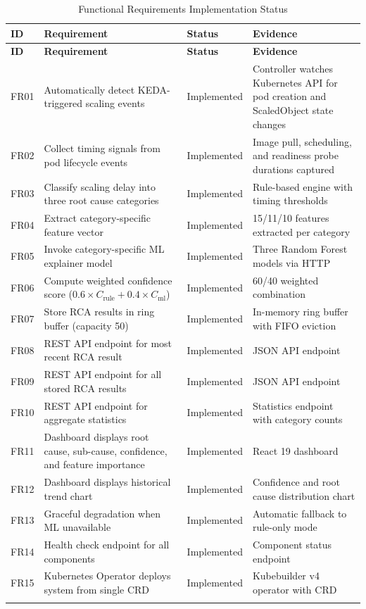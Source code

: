 \begin{xltabular}{\textwidth}{|p{1.2cm}|p{5cm}|p{2.3cm}|X|}
\hline
\textbf{ID} & \textbf{Requirement} & \textbf{Status} & \textbf{Evidence} \\ \hline
\endfirsthead
\hline
\textbf{ID} & \textbf{Requirement} & \textbf{Status} & \textbf{Evidence} \\ \hline
\endhead
FR01 & Automatically detect KEDA-triggered scaling events & Implemented & Controller watches Kubernetes API for pod creation and ScaledObject state changes \\ \hline
FR02 & Collect timing signals from pod lifecycle events & Implemented & Image pull, scheduling, and readiness probe durations captured \\ \hline
FR03 & Classify scaling delay into three root cause categories & Implemented & Rule-based engine with timing thresholds \\ \hline
FR04 & Extract category-specific feature vector & Implemented & 15/11/10 features extracted per category \\ \hline
FR05 & Invoke category-specific ML explainer model & Implemented & Three Random Forest models via HTTP \\ \hline
FR06 & Compute weighted confidence score ($0.6 \times C_{\text{rule}} + 0.4 \times C_{\text{ml}}$) & Implemented & 60/40 weighted combination \\ \hline
FR07 & Store RCA results in ring buffer (capacity 50) & Implemented & In-memory ring buffer with FIFO eviction \\ \hline
FR08 & REST API endpoint for most recent RCA result & Implemented & JSON API endpoint \\ \hline
FR09 & REST API endpoint for all stored RCA results & Implemented & JSON API endpoint \\ \hline
FR10 & REST API endpoint for aggregate statistics & Implemented & Statistics endpoint with category counts \\ \hline
FR11 & Dashboard displays root cause, sub-cause, confidence, and feature importance & Implemented & React 19 dashboard \\ \hline
FR12 & Dashboard displays historical trend chart & Implemented & Confidence and root cause distribution chart \\ \hline
FR13 & Graceful degradation when ML unavailable & Implemented & Automatic fallback to rule-only mode \\ \hline
FR14 & Health check endpoint for all components & Implemented & Component status endpoint \\ \hline
FR15 & Kubernetes Operator deploys system from single CRD & Implemented & Kubebuilder v4 operator with CRD \\ \hline
\caption{Functional Requirements Implementation Status}
\label{tab:fr_status}
\end{xltabular}

